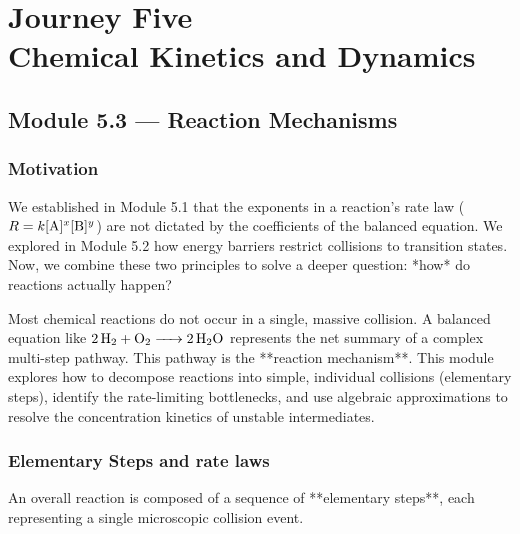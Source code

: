 \documentclass[12pt, a4paper]{book}
\begin{document}
\setcounter{chapter}{4}
\chapter[Journey 5 --- Chemical Kinetics and Dynamics]
        {Journey Five\\[8pt]
         \textcolor{ModuleColor}{\large Chemical Kinetics and Dynamics}}
\setcounter{section}{2}

\section{Module 5.3 --- Reaction Mechanisms}
\label{sec:mod5.3}

\subsection*{Motivation}

We established in Module 5.1 that the exponents in a reaction's rate law ($R = k[\ce{A}]^x[\ce{B}]^y$) are not dictated by the coefficients of the balanced equation.
We explored in Module 5.2 how energy barriers restrict collisions to transition states.
Now, we combine these two principles to solve a deeper question: *how* do reactions actually happen?

Most chemical reactions do not occur in a single, massive collision.
A balanced equation like $\ce{2 H2 + O2 -> 2 H2O}$ represents the net summary of a complex multi-step pathway.
This pathway is the **reaction mechanism**.
This module explores how to decompose reactions into simple, individual collisions (elementary steps), identify the rate-limiting bottlenecks, and use algebraic approximations to resolve the concentration kinetics of unstable intermediates.

\subsection{Elementary Steps and rate laws}

An overall reaction is composed of a sequence of **elementary steps**, each representing a single microscopic collision event.
\end{document}

